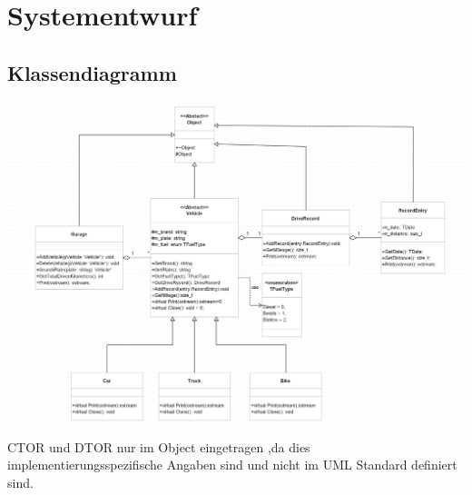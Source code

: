 \documentclass[12pt,naustrian,a4widepaper]{scrartcl}
\begin{document}
\clearpage
\section{Systementwurf}

\subsection{Klassendiagramm}
\includegraphics[width=14cm]{./Images/Klassendiagramm.png}
CTOR und DTOR nur im Object eingetragen ,da dies implementierungsspezifische Angaben sind und nicht im UML Standard definiert sind. \\
\newpage
\end{document}
